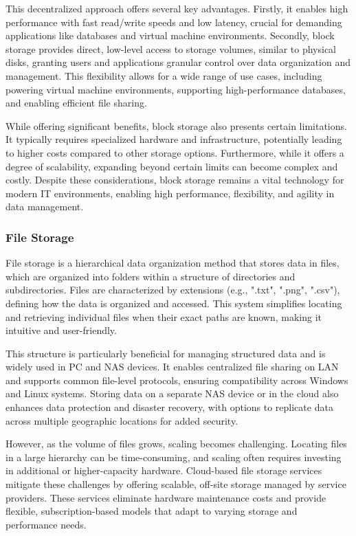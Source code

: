 This decentralized approach offers several key advantages. Firstly, it enables high performance with fast read/write speeds and low latency, crucial for demanding applications like databases and virtual machine environments. Secondly, block storage provides direct, low-level access to storage volumes, similar to physical disks, granting users and applications granular control over data organization and management. This flexibility allows for a wide range of use cases, including powering virtual machine environments, supporting high-performance databases, and enabling efficient file sharing.

While offering significant benefits, block storage also presents certain limitations. It typically requires specialized hardware and infrastructure, potentially leading to higher costs compared to other storage options. Furthermore, while it offers a degree of scalability, expanding beyond certain limits can become complex and costly. Despite these considerations, block storage remains a vital technology for modern IT environments, enabling high performance, flexibility, and agility in data management.

\subsubsection*{File Storage}

File storage is a hierarchical data organization method that stores data in files, which are organized into folders within a structure of directories and subdirectories. Files are characterized by extensions (e.g., ".txt", ".png", ".csv"), defining how the data is organized and accessed. This system simplifies locating and retrieving individual files when their exact paths are known, making it intuitive and user-friendly.

This structure is particularly beneficial for managing structured data and is widely used in \gls{PC} and \gls{NAS} devices. It enables centralized file sharing on  \gls{LAN} and supports common file-level protocols, ensuring compatibility across Windows and Linux systems. Storing data on a separate NAS device or in the cloud also enhances data protection and disaster recovery, with options to replicate data across multiple geographic locations for added security.

However, as the volume of files grows, scaling becomes challenging. Locating files in a large hierarchy can be time-consuming, and scaling often requires investing in additional or higher-capacity hardware. Cloud-based file storage services mitigate these challenges by offering scalable, off-site storage managed by service providers. These services eliminate hardware maintenance costs and provide flexible, subscription-based models that adapt to varying storage and performance needs.

